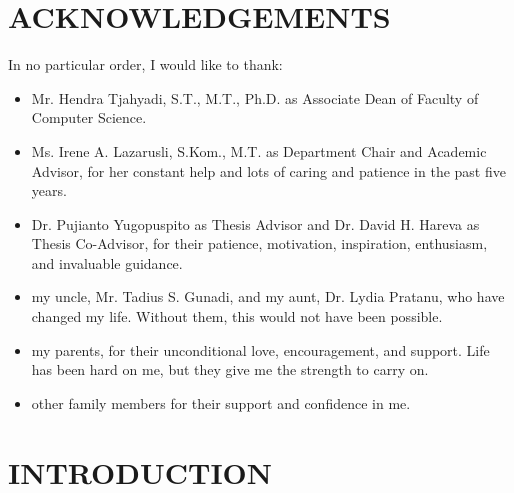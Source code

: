\documentclass[a4paper, 12pt, oneside]{book}
\begin{document}
\chapter{ACKNOWLEDGEMENTS}

\begin{doublespace}
In no particular order, I would like to thank:
 
\begin{itemize}
    \item Mr. Hendra Tjahyadi, S.T., M.T., Ph.D. as Associate Dean of Faculty of Computer Science.
    \item Ms. Irene A. Lazarusli, S.Kom., M.T. as Department Chair and Academic Advisor, for her constant help and lots of caring and patience in the past five years.
    \item Dr. Pujianto Yugopuspito as Thesis Advisor and Dr. David H. Hareva as Thesis Co-Advisor, for their patience, motivation, inspiration, enthusiasm, and invaluable guidance.
    \item my uncle, Mr. Tadius S. Gunadi, and my aunt, Dr. Lydia Pratanu, who have changed my life. Without them, this would not have been possible.
    \item my parents, for their unconditional love, encouragement, and support. Life has been hard on me, but they give me the strength to carry on.
    \item other family members for their support and confidence in me.
\end{itemize}
    
\end{doublespace}

\tableofcontents

{
    \let\oldnumberline\numberline
    \renewcommand{\numberline}{\tablename~\oldnumberline}
    \listoftables
}

{
    \let\oldnumberline\numberline
    \renewcommand{\numberline}{\figurename~\oldnumberline}
    \listoffigures
}

{
    \let\oldnumberline\numberline
    \renewcommand{\numberline}{\listingname~\oldnumberline}
    \listoflistings
}



\mainmatter

\chapter{INTRODUCTION}
\label{ch:introduction}
\end{document}
